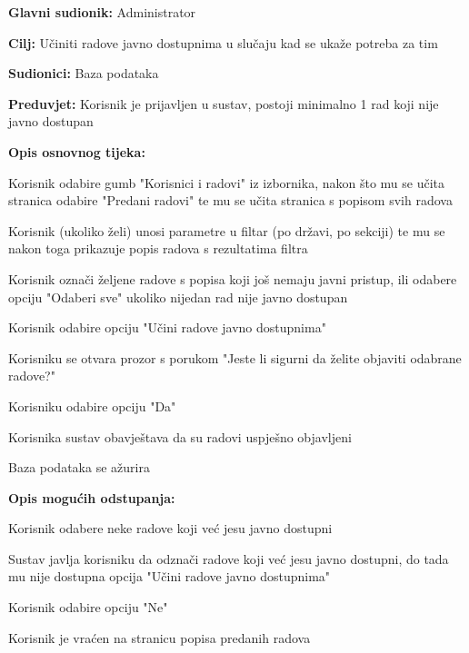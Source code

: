 					\begin{packed_item}
						
						\item \textbf{Glavni sudionik: } Administrator
						\item  \textbf{Cilj:} Učiniti radove javno dostupnima u slučaju kad se ukaže potreba za tim
						\item  \textbf{Sudionici:} Baza podataka
						\item  \textbf{Preduvjet:} Korisnik je prijavljen u sustav, postoji minimalno 1 rad koji nije javno dostupan
						\item  \textbf{Opis osnovnog tijeka:}
						
						\item[] \begin{packed_enum}
							\item Korisnik odabire gumb "Korisnici i radovi" iz izbornika, nakon što mu se učita stranica odabire "Predani radovi" te mu se učita stranica s popisom svih radova
							\item Korisnik (ukoliko želi) unosi parametre u filtar (po državi, po sekciji) te mu se nakon toga prikazuje popis radova s rezultatima filtra
							\item	 Korisnik označi željene radove s popisa koji još nemaju javni pristup, ili odabere opciju "Odaberi sve" ukoliko nijedan rad nije javno dostupan
							\item Korisnik odabire opciju "Učini radove javno dostupnima"
							\item Korisniku se otvara prozor s porukom "Jeste li sigurni da želite objaviti odabrane radove?"
							\item Korisniku odabire opciju "Da"
							\item Korisnika sustav obavještava da su radovi uspješno objavljeni
							\item Baza podataka se ažurira
							
						\end{packed_enum}
					
						\item \textbf{Opis mogućih odstupanja:}
						\item[] \begin{packed_enum}
							\item[1.a] Korisnik odabere neke radove koji već jesu javno dostupni
							\item[] \begin{packed_enum}
								\item[1.] Sustav javlja korisniku da odznači radove koji već jesu javno dostupni, do tada mu nije dostupna opcija "Učini radove javno dostupnima"
							\end{packed_enum}
							\item[4.a] Korisnik odabire opciju "Ne"
							\item[] \begin{packed_enum}
								\item[1.] Korisnik je vraćen na stranicu popisa predanih radova
							\end{packed_enum} 
						\end{packed_enum}
						

\end{packed_item}

